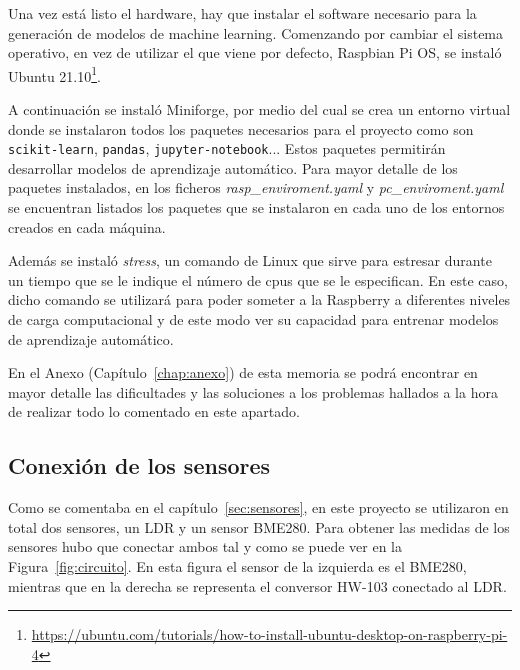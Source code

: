 \documentclass[a4paper, 12pt]{book}
\begin{document}
Una vez está listo el hardware, hay que instalar el software necesario para la generación de modelos de machine learning.
Comenzando por cambiar el sistema operativo, en vez de utilizar el que viene por defecto, Raspbian Pi OS, se instaló Ubuntu 21.10\footnote{\url{https://ubuntu.com/tutorials/how-to-install-ubuntu-desktop-on-raspberry-pi-4}}.

A continuación se instaló Miniforge, por medio del cual se crea un entorno virtual donde se instalaron todos los paquetes necesarios para el proyecto como son \texttt{scikit-learn}, \texttt{pandas}, \texttt{jupyter-notebook}... Estos paquetes permitirán desarrollar modelos de aprendizaje automático. Para mayor detalle de los paquetes instalados, en los ficheros \textit{rasp\_enviroment.yaml} y \textit{pc\_enviroment.yaml} se encuentran listados los paquetes que se instalaron en cada uno de los entornos creados en cada máquina.

Además se instaló \textit{stress}, un comando de Linux que sirve para estresar durante un tiempo que se le indique el número de cpus que se le especifican. En este caso, dicho comando se utilizará para poder someter a la Raspberry a diferentes niveles de carga computacional y de este modo ver su capacidad para entrenar modelos de aprendizaje automático. 

En el Anexo (Capítulo~\ref{chap:anexo}) de esta memoria se podrá encontrar en mayor detalle las dificultades y las soluciones a los problemas hallados a la hora de realizar todo lo comentado en este apartado.


\subsection{Conexión de los sensores}
\label{subsec:conexion_sensores}

Como se comentaba en el capítulo~\ref{sec:sensores}, en este proyecto se utilizaron en total dos sensores, un LDR y un sensor BME280. Para obtener las medidas de los sensores hubo que conectar ambos tal y como se puede ver en la Figura~\ref{fig:circuito}. En esta figura el sensor de la izquierda es el BME280, mientras que en la derecha se representa el conversor HW-103 conectado al LDR.
\end{document}
